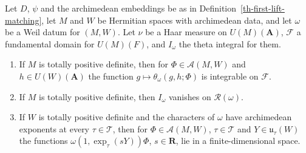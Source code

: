 \begin{lemma}\label{th-first-lift-relations}
Let $D$, $\psi$ and the archimedean embeddings be as in
Definition~\ref{th-first-lift-matching}, let $M$ and $W$ be Hermitian spaces
with archimedean data, and let $\omega$ be a Weil datum for $(M,W)$. Let $\nu$
be a Haar measure on $U(M)(\mathbf A)$, $\mathcal F$ a fundamental domain for
$U(M)(F)$, and $I_\omega$ the theta integral for them.
\begin{enumerate}
\item If $M$ is totally positive definite, then for $\Phi\in\mathcal A(M,W)$ and
  $h\in U(W)(\mathbf A)$ the function $g\mapsto\theta_\omega(g,h;\Phi)$ is
  integrable on $\mathcal F$.
\item If $M$ is totally positive definite, then $I_\omega$ vanishes on
  $\mathcal R(\omega)$.
\item If $W$ is totally positive definite and the characters of $\omega$ have
  archimedean exponents at every $\tau\in\mathcal T$, then for
  $\Phi\in\mathcal A(M,W)$, $\tau\in\mathcal T$ and $Y\in\mathfrak u_\tau(W)$
  the functions $\omega(1,\exp_\tau(sY))\Phi$, $s\in\mathbf R$, lie in a
  finite-dimensional space.
\end{enumerate}
\end{lemma}
